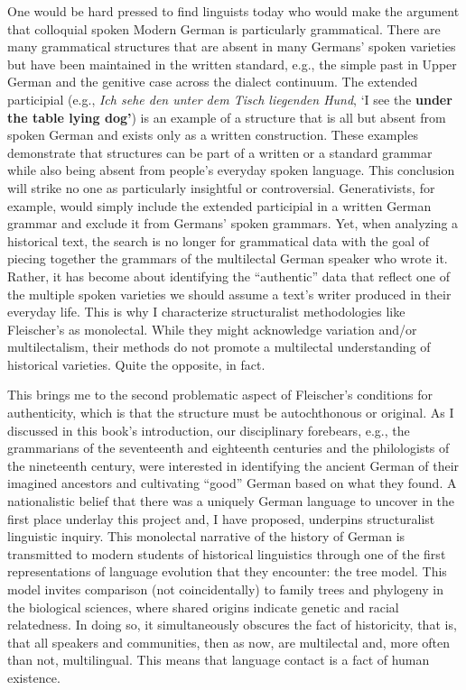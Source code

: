One would be hard pressed to find linguists today who would make the argument that colloquial spoken Modern German is particularly grammatical. There are many grammatical structures that are absent in many Germans’ spoken varieties but have been maintained in the written standard, e.g., the simple past in Upper German and the genitive case across the dialect continuum. The extended participial (e.g., \textit{Ich sehe den \textit{unter dem Tisch liegenden Hund}}, ‘I see the \textbf{under the table lying dog’}) is an example of a structure that is all but absent from spoken German and exists only as a written construction. These examples demonstrate that structures can be part of a written or a standard grammar while also being absent from people’s everyday spoken language. This conclusion will strike no one as particularly insightful or controversial. Generativists, for example, would simply include the extended participial in a written German grammar and exclude it from Germans’ spoken grammars. Yet, when analyzing a historical text, the search is no longer for grammatical data with the goal of piecing together the grammars of the multilectal German speaker who wrote it. Rather, it has become about identifying the “authentic” data that reflect one of the multiple spoken varieties we should assume a text’s writer produced in their everyday life. This is why I characterize structuralist methodologies like Fleischer’s as monolectal. While they might acknowledge variation and/or multilectalism, their methods do not promote a multilectal understanding of historical varieties. Quite the opposite, in fact.

This brings me to the second problematic aspect of Fleischer’s conditions for authenticity, which is that the structure must be autochthonous or original. As I discussed in this book’s introduction, our disciplinary forebears, e.g., the grammarians of the seventeenth and eighteenth centuries and the philologists of the nineteenth century, were interested in identifying the ancient German of their imagined ancestors and cultivating “good” German based on what they found. A nationalistic belief that there was a uniquely German language to uncover in the first place underlay this project and, I have proposed, underpins structuralist linguistic inquiry. This monolectal narrative of the history of German is transmitted to modern students of historical linguistics through one of the first representations of language evolution that they encounter: the tree model. This model invites comparison (not coincidentally) to family trees and phylogeny in the biological sciences, where shared origins indicate genetic and racial relatedness. In doing so, it simultaneously obscures the fact of historicity, that is, that all speakers and communities, then as now, are multilectal and, more often than not, multilingual. This means that language contact is a fact of human existence.


